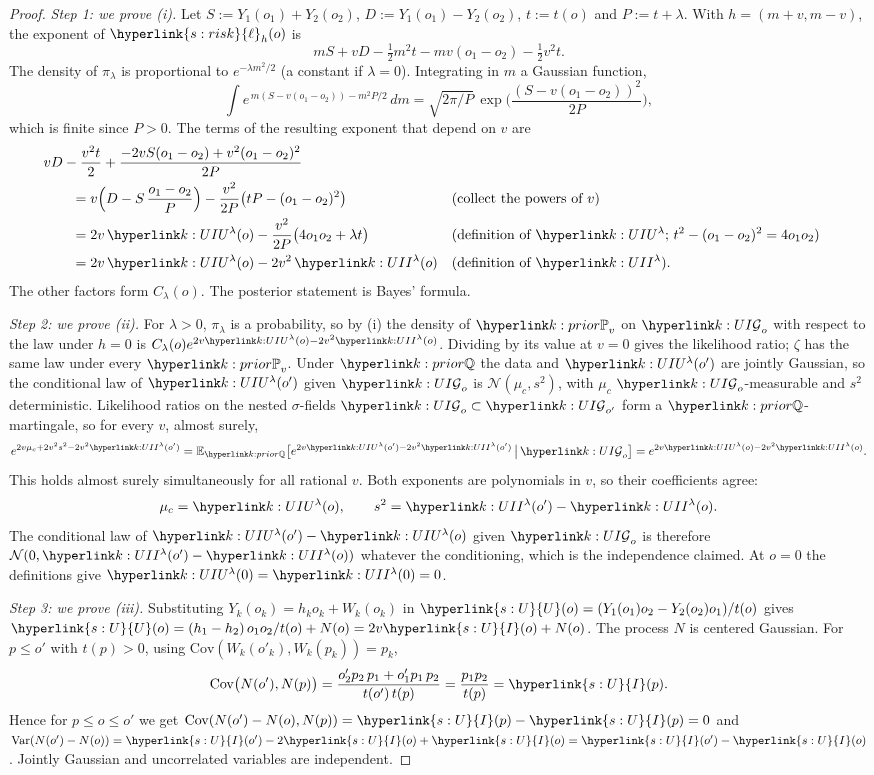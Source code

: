 \documentclass[11pt]{article}
\DeclareRobustCommand{\sy}[2]{{\hyperlink{#1}{#2}}}
\newcommand{\E}{\mathbb{E}}
\newcommand{\1}{\mathbf{1}}
\newcommand{\lh}{\sy{s:risk}{\ell}}
\newcommand{\Ud}{\sy{s:U}{U}}
\newcommand{\Id}{\sy{s:U}{I}}
\begin{document}
\begin{proof}
\textit{Step 1: we prove (i).} Let $S:=Y_1(o_1)+Y_2(o_2)$, $D:=Y_1(o_1)-Y_2(o_2)$, $t:=t(o)$ and $P:=t+\lambda$. With $h=(m+v,m-v)$, the exponent of $\lh_h(o)$ is
\[
mS+vD-\tfrac12m^2t-mv(o_1-o_2)-\tfrac12v^2t .
\]
The density of $\pi_\lambda$ is proportional to $e^{-\lambda m^2/2}$ (a constant if $\lambda=0$). Integrating in $m$ a Gaussian function,
\[
\int e^{\,m(S-v(o_1-o_2))-m^2P/2}\,dm=\sqrt{2\pi/P}\,\exp\Big(\frac{(S-v(o_1-o_2))^2}{2P}\Big),
\]
which is finite since $P>0$. The terms of the resulting exponent that depend on $v$ are
\begin{align*}
&vD-\frac{v^2t}{2}+\frac{-2vS(o_1-o_2)+v^2(o_1-o_2)^2}{2P}\\
&\qquad=v\Big(D-S\,\frac{o_1-o_2}{P}\Big)-\frac{v^2}{2P}\big(tP-(o_1-o_2)^2\big) && \text{(collect the powers of $v$)}\\
&\qquad=2v\,\kU(o)-\frac{v^2}{2P}\big(4o_1o_2+\lambda t\big) && \text{(definition of $\kU$; $t^2-(o_1-o_2)^2=4o_1o_2$)}\\
&\qquad=2v\,\kU(o)-2v^2\,\kI(o) && \text{(definition of $\kI$)}.
\end{align*}
The other factors form $C_\lambda(o)$. The posterior statement is Bayes' formula.

\textit{Step 2: we prove (ii).} For $\lambda>0$, $\pi_\lambda$ is a probability, so by (i) the density of $\kP{v}$ on $\kF_o$ with respect to the law under $h=0$ is
$C_\lambda(o)e^{2v\kU(o)-2v^2\kI(o)}$. Dividing by its value at $v=0$ gives the likelihood ratio; $\zeta$ has the same law under every $\kP{v}$. Under $\kQ$ the data
and $\kU(o')$ are jointly Gaussian, so the conditional law of $\kU(o')$ given $\kF_o$ is $\mathcal N(\mu_c,s^2)$, with $\mu_c$ $\kF_o$-measurable and $s^2$ deterministic.
Likelihood ratios on the nested $\sigma$-fields $\kF_o\subset\kF_{o'}$ form a $\kQ$-martingale, so for every $v$, almost surely,
\[
e^{2v\mu_c+2v^2s^2-2v^2\kI(o')}=\E_{\kQ}\big[e^{2v\kU(o')-2v^2\kI(o')}\,\big|\,\kF_o\big]=e^{2v\kU(o)-2v^2\kI(o)} .
\]
This holds almost surely simultaneously for all rational $v$. Both exponents are polynomials in $v$, so their coefficients agree:
\[
\mu_c=\kU(o),\qquad s^2=\kI(o')-\kI(o).
\]
The conditional law of $\kU(o')-\kU(o)$ given $\kF_o$ is therefore $\mathcal N(0,\kI(o')-\kI(o))$ whatever the conditioning, which is the independence claimed.
At $o=0$ the definitions give $\kU(0)=\kI(0)=0$.

\textit{Step 3: we prove (iii).} Substituting $Y_k(o_k)=h_ko_k+W_k(o_k)$ in $\Ud(o)=(Y_1(o_1)o_2-Y_2(o_2)o_1)/t(o)$ gives
$\Ud(o)=(h_1-h_2)\,o_1o_2/t(o)+N(o)=2v\Id(o)+N(o)$. The process $N$ is centered Gaussian. For $p\le o'$ with $t(p)>0$, using
$\mathrm{Cov}(W_k(o'_k),W_k(p_k))=p_k$,
\[
\mathrm{Cov}\big(N(o'),N(p)\big)=\frac{o'_2p_2\,p_1+o'_1p_1\,p_2}{t(o')\,t(p)}=\frac{p_1p_2}{t(p)}=\Id(p).
\]
Hence for $p\le o\le o'$ we get $\mathrm{Cov}(N(o')-N(o),N(p))=\Id(p)-\Id(p)=0$ and $\mathrm{Var}(N(o')-N(o))=\Id(o')-2\Id(o)+\Id(o)=\Id(o')-\Id(o)$.
Jointly Gaussian and uncorrelated variables are independent.
\end{proof}
\end{document}
